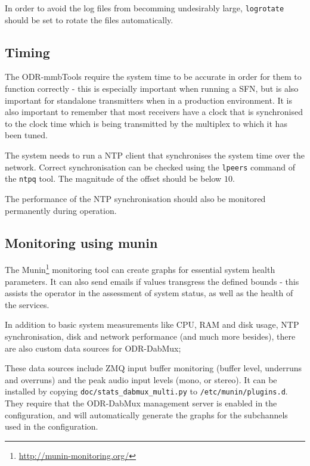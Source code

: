 
In order to avoid the log files from becomming undesirably large, \texttt{logrotate}
should be set to rotate the files automatically.



\subsection{Timing}
The ODR-mmbTools require the system time to be accurate in order for them to
function correctly - this is especially important when running a SFN, but is
also important for standalone transmitters when in a production environment. It
is also important to remember that most receivers have a clock that is
synchronised to the clock time which is being transmitted by the multiplex to
which it has been tuned.

The system needs to run a NTP client that synchronises the system time over the
network. Correct synchronisation can be checked using the \texttt{lpeers}
command of the \texttt{ntpq} tool. The magnitude of the offset should be below
$10$\ms.

The performance of the NTP synchronisation should also be monitored permanently
during operation.


\subsection{Monitoring using munin}

The Munin\footnote{\url{http://munin-monitoring.org/}} monitoring tool can
create graphs for essential system health parameters. It can also send emails
if values transgress the defined bounds - this assists the operator in the
assessment of system status, as well as the health of the services.

In addition to basic system measurements like CPU, RAM and disk usage, NTP
synchronisation, disk and network performance (and much more besides), there
are also custom data sources for ODR-DabMux;

These data sources include ZMQ input buffer monitoring (buffer level, underruns
and overruns) and the peak audio input levels (mono, or stereo). It
can be installed by copying \verb+doc/stats_dabmux_multi.py+ to
\texttt{/etc/munin/plugins.d}. They require that the ODR-DabMux management
server is enabled in the configuration, and will automatically generate the
graphs for the subchannels used in the configuration.


